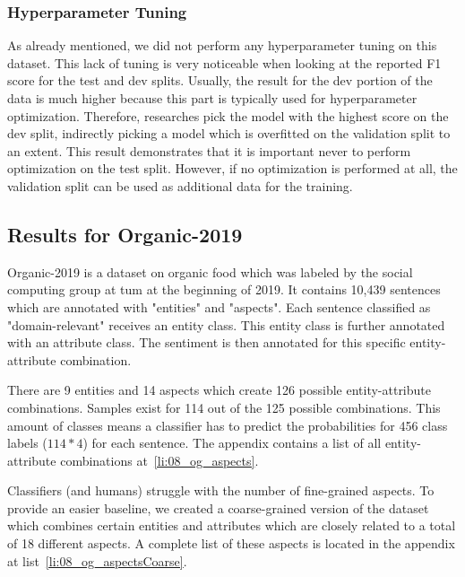 \subsubsection*{Hyperparameter Tuning}
\label{sec:06_hpTuningAmazon}
As already mentioned, we did not perform any hyperparameter tuning on this dataset. This lack of tuning is very noticeable when looking at the reported F1 score for the test and dev splits. Usually, the result for the dev portion of the data is much higher because this part is typically used for hyperparameter optimization. Therefore, researches pick the model with the highest score on the dev split, indirectly picking a model which is overfitted on the validation split to an extent. This result demonstrates that it is important never to perform optimization on the test split. However, if no optimization is performed at all, the validation split can be used as additional data for the training.  



\subsection{Results for Organic-2019}
\label{sec:06_ResultsOrganic}

Organic-2019 is a dataset on organic food which was labeled by the social computing group at \gls{tum} at the beginning of 2019. It contains 10,439 sentences which are annotated with "entities" and "aspects". Each sentence classified as "domain-relevant" receives an entity class. This entity class is further annotated with an attribute class. The sentiment is then annotated for this specific entity-attribute combination.
\medskip

There are 9 entities and 14 aspects which create 126 possible entity-attribute combinations. Samples exist for 114 out of the 125 possible combinations. This amount of classes means a classifier has to predict the probabilities for 456 class labels {($114*4$)} for each sentence. The appendix contains a list of all entity-attribute combinations at~\ref{li:08_og_aspects}.
\medskip

Classifiers {(and humans)} struggle with the number of fine-grained aspects. To provide an easier baseline, we created a coarse-grained version of the dataset which combines certain entities and attributes which are closely related to a total of 18 different aspects. A complete list of these aspects is located in the appendix at list~\ref{li:08_og_aspectsCoarse}.
\medskip

